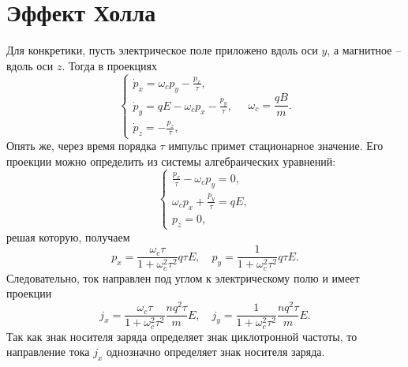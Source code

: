\section{Эффект Холла}
    Для конкретики, пусть электрическое поле приложено вдоль оси \( y \), а
    магнитное -- вдоль оси \( z \). Тогда в проекциях
    \[
        \left\{
            \begin{array}{l}
                \dot{p}_x = \omega_c p_y - \frac{p_x}{\tau}, \\
                \dot{p}_y = qE - \omega_c p_x - \frac{p_y}{\tau}, \\
                \dot{p}_z = -\frac{p_z}{\tau},
            \end{array}
        \right.
        \quad
        \omega_c = \frac{qB}{m}.
    \]
    Опять же, через время порядка \( \tau \) импульс примет стационарное
    значение. Его проекции можно определить из системы алгебраических уравнений:
    \[
        \left\{
            \begin{array}{l}
                \frac{p_x}{\tau} - \omega_c p_y = 0,  \\
                \omega_c p_x + \frac{p_y}{\tau} = qE, \\
                p_z = 0,
            \end{array}
        \right.
    \]
    решая которую, получаем
    \[
        p_x = \frac{\omega_c\tau}{1+\omega_c^2\tau^2}q\tau E,\quad
        p_y = \frac{1}{1+\omega_c^2\tau^2}q\tau E.
    \]
    Следовательно, ток направлен под углом к электрическому полю и имеет
    проекции
    \[
        j_x = \frac{\omega_c\tau}{1+\omega_c^2\tau^2}\frac{nq^2\tau}{m} E,\quad
        j_y = \frac{1}{1+\omega_c^2\tau^2}\frac{nq^2\tau}{m} E.
    \]
    Так как знак носителя заряда определяет знак циклотронной частоты, то
    направление тока \( j_x \) однозначно определяет знак носителя заряда.

